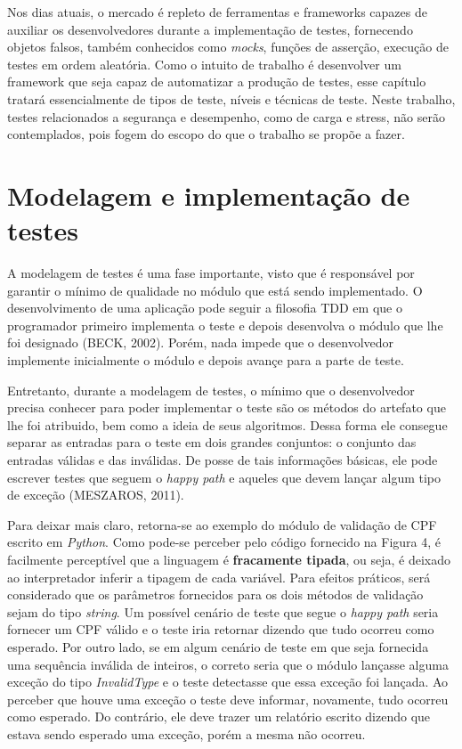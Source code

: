 \documentclass[
    12pt,       %
    openright,      %
    twoside,      %
    a4paper,      %
    english,      %
    french,       %
    spanish,      %
    brazil,       %
    ]{abntex2}
\begin{document}
      Nos dias atuais, o mercado é repleto de ferramentas e frameworks capazes de
      auxiliar os desenvolvedores durante a implementação de testes, fornecendo
      objetos falsos, também conhecidos como \textit{mocks}, funções de asserção,
      execução de testes em ordem aleatória. Como o intuito de trabalho é desenvolver
      um framework que seja capaz de automatizar a produção de testes, esse capítulo
      tratará essencialmente de tipos de teste, níveis e técnicas de teste. Neste trabalho,
      testes relacionados a segurança e desempenho, como de carga e stress, não serão
      contemplados, pois fogem do escopo do que o trabalho se propõe a fazer.

      \section{Modelagem e implementação de testes}
          A modelagem de testes é uma fase importante, visto que é responsável
          por garantir o mínimo de qualidade no módulo que está sendo implementado.
          O desenvolvimento de uma aplicação pode seguir a filosofia TDD em que o
          programador primeiro implementa o teste e depois desenvolva o módulo que
          lhe foi designado (BECK, 2002). Porém, nada impede que o desenvolvedor implemente
          inicialmente o módulo e depois avançe para a parte de teste.

          Entretanto, durante a modelagem de testes, o mínimo que o desenvolvedor precisa
          conhecer para poder implementar o teste são os métodos do artefato que
          lhe foi atribuido, bem como a ideia de seus algoritmos. Dessa forma ele
          consegue separar as entradas para o teste em dois grandes conjuntos: o
          conjunto das entradas válidas e das inválidas. De posse de tais informações
          básicas, ele pode escrever testes que seguem o \textit{happy path} e aqueles
          que devem lançar algum tipo de exceção (MESZAROS, 2011).

          Para deixar mais claro, retorna-se ao exemplo do módulo de validação de CPF
          escrito em \textit{Python}. Como pode-se perceber pelo código fornecido na
          Figura 4, é facilmente perceptível que a linguagem é \textbf{fracamente tipada},
          ou seja, é deixado ao interpretador inferir a tipagem de cada variável. Para
          efeitos práticos, será considerado que os parâmetros fornecidos para os dois
          métodos de validação sejam do tipo \textit{string}. Um possível cenário de teste
          que segue o \textit{happy path} seria fornecer um CPF válido e o teste iria
          retornar dizendo que tudo ocorreu como esperado. Por outro lado, se em algum
          cenário de teste em que seja fornecida uma sequência inválida de inteiros, o correto
          seria que o módulo lançasse alguma exceção do tipo \textit{InvalidType} e o
          teste detectasse que essa exceção foi lançada. Ao perceber que houve uma exceção
          o teste deve informar, novamente, tudo ocorreu como esperado. Do contrário, ele
          deve trazer um relatório escrito dizendo que estava sendo esperado uma exceção,
          porém a mesma não ocorreu.
\end{document}
